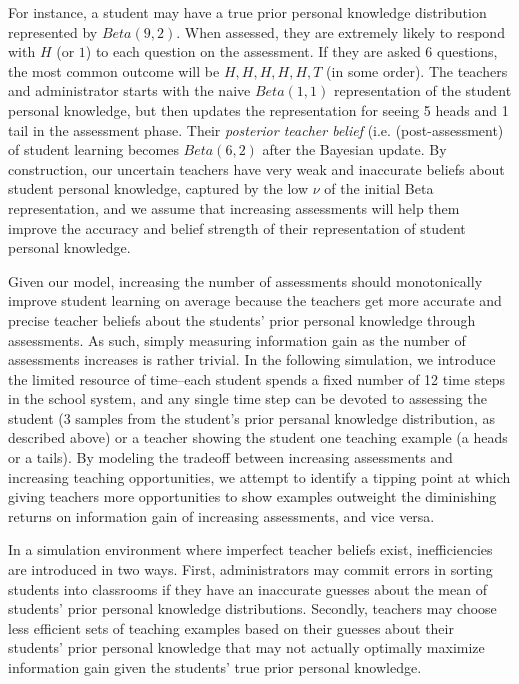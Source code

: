 \documentclass[10pt, letterpaper]{article}
\begin{document}
For instance, a student may have a true prior personal knowledge
distribution represented by \(Beta(9,2)\). When assessed, they are
extremely likely to respond with \(H\) (or \(1\)) to each question on
the assessment. If they are asked 6 questions, the most common outcome
will be \({H, H, H, H, H, T}\) (in some order). The teachers and
administrator starts with the naive \(Beta(1,1)\) representation of the
student personal knowledge, but then updates the representation for
seeing 5 heads and 1 tail in the assessment phase. Their \emph{posterior
teacher belief} (i.e. (post-assessment) of student learning becomes
\(Beta(6,2)\) after the Bayesian update. By construction, our uncertain
teachers have very weak and inaccurate beliefs about student personal
knowledge, captured by the low \(\nu\) of the initial Beta
representation, and we assume that increasing assessments will help them
improve the accuracy and belief strength of their representation of
student personal knowledge.

Given our model, increasing the number of assessments should
monotonically improve student learning on average because the teachers
get more accurate and precise teacher beliefs about the students' prior
personal knowledge through assessments. As such, simply measuring
information gain as the number of assessments increases is rather
trivial. In the following simulation, we introduce the limited resource
of time--each student spends a fixed number of 12 time steps in the
school system, and any single time step can be devoted to assessing the
student (3 samples from the student's prior persanal knowledge
distribution, as described above) or a teacher showing the student one
teaching example (a heads or a tails). By modeling the tradeoff between
increasing assessments and increasing teaching opportunities, we attempt
to identify a tipping point at which giving teachers more opportunities
to show examples outweight the diminishing returns on information gain
of increasing assessments, and vice versa.

In a simulation environment where imperfect teacher beliefs exist,
inefficiencies are introduced in two ways. First, administrators may
commit errors in sorting students into classrooms if they have an
inaccurate guesses about the mean of students' prior personal knowledge
distributions. Secondly, teachers may choose less efficient sets of
teaching examples based on their guesses about their students' prior
personal knowledge that may not actually optimally maximize information
gain given the students' true prior personal knowledge.
\end{document}
